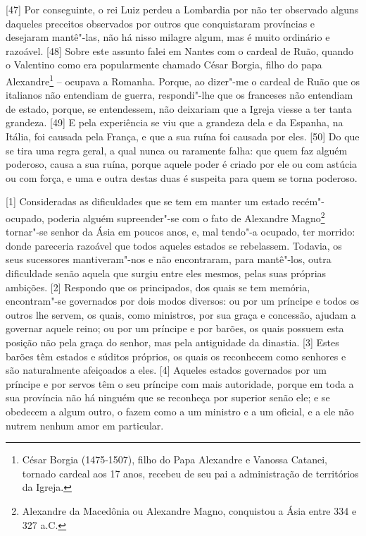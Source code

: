 {[}47{]} Por conseguinte, o rei Luiz perdeu a Lombardia por não ter
observado alguns daqueles preceitos observados por outros que
conquistaram províncias e desejaram mantê"-las, não há nisso milagre
algum, mas é muito ordinário e razoável. {[}48{]} Sobre este assunto
falei em Nantes com o cardeal de Ruão, quando o Valentino como era
popularmente chamado César Borgia, filho do papa Alexandre\footnote{César
  Borgia (1475-1507), filho do Papa Alexandre  e Vanossa Catanei,
  tornado cardeal aos 17 anos, recebeu de seu pai a administração de
  territórios da Igreja.} -- ocupava a Romanha. Porque, ao dizer"-me o
cardeal de Ruão que os italianos não entendiam de guerra, respondi"-lhe
que os franceses não entendiam de estado, porque, se entendessem, não
deixariam que a Igreja viesse a ter tanta grandeza. {[}49{]} E pela
experiência se viu que a grandeza dela e da Espanha, na Itália, foi
causada pela França, e que a sua ruína foi causada por eles. {[}50{]} Do
que se tira uma regra geral, a qual nunca ou raramente falha: que quem
faz alguém poderoso, causa a sua ruína, porque aquele poder é criado por
ele ou com astúcia ou com força, e uma e outra destas duas é suspeita
para quem se torna poderoso.


{[}1{]} Consideradas as dificuldades que se tem em manter um estado
recém"-ocupado, poderia alguém supreender"-se com o fato de Alexandre
Magno\footnote{Alexandre da Macedônia ou Alexandre Magno, conquistou a
  Ásia entre 334 e 327 a.C.} tornar"-se senhor da Ásia em poucos anos, e,
mal tendo"-a ocupado, ter morrido: donde pareceria razoável que todos
aqueles estados se rebelassem. Todavia, os seus sucessores
mantiveram"-nos e não encontraram, para mantê"-los, outra dificuldade
senão aquela que surgiu entre eles mesmos, pelas suas próprias ambições.
{[}2{]} Respondo que os principados, dos quais se tem memória,
encontram"-se governados por dois modos diversos: ou por um príncipe e
todos os outros lhe servem, os quais, como ministros, por sua graça e
concessão, ajudam a governar aquele reino; ou por um príncipe e por
barões, os quais possuem esta posição não pela graça do senhor, mas pela
antiguidade da dinastia. {[}3{]} Estes barões têm estados e súditos
próprios, os quais os reconhecem como senhores e são naturalmente
afeiçoados a eles. {[}4{]} Aqueles estados governados por um príncipe e
por servos têm o seu príncipe com mais autoridade, porque em toda a sua
província não há ninguém que se reconheça por superior senão ele; e se
obedecem a algum outro, o fazem como a um ministro e a um oficial, e a
ele não nutrem nenhum amor em particular.

